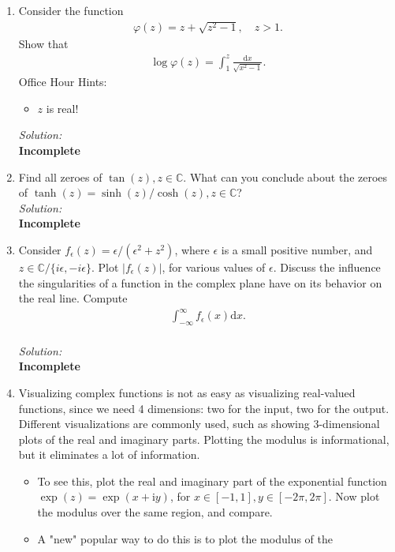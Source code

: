 \documentclass[10pt]{amsart}
\newcommand{\D}{\mathrm{d}}
\newcommand{\I}{\mathrm{i}}
\theoremstyle{nonumberplain}
\begin{document}
\begin{enumerate}[label={\bf {\arabic*}:}]
\item Consider the function
    \begin{align*}
      \varphi(z) = z + \sqrt{z^2 - 1}, \quad z > 1.
    \end{align*}
    Show that
    \begin{align*}
      \log \varphi(z) = \int_1^z \frac{\D x}{\sqrt{x^2 - 1}}.
    \end{align*}
Office Hour Hints:
\begin{itemize}
\item $z$ is real!
\end{itemize}
\textit{Solution:} \\
\textbf{Incomplete} \\
\item Find all zeroes of $\tan (z), z \in \mathbb{C}$. What can you
  conclude about the zeroes of $\tanh (z)=\sinh (z) / \cosh (z), z \in
  \mathbb C$?\\
\textit{Solution:} \\
\textbf{Incomplete} \\
\item Consider $f_\epsilon(z)=\epsilon /\left(\epsilon^2+z^2\right)$, where
  $\epsilon$ is a small positive number, and $z \in \mathbb{C} /\{i
  \epsilon,-i \epsilon\}$. Plot $\left|f_\epsilon(z)\right|$, for various
  values of $\epsilon$. Discuss the influence the singularities of a
  function in the complex plane have on its behavior on the real
  line. Compute
  \begin{align*}
    \int_{-\infty}^\infty f_\epsilon(x) \D x.
  \end{align*}\\
\textit{Solution:} \\
\textbf{Incomplete} \\
\item Visualizing complex functions is not as easy as visualizing
  real-valued functions, since we need 4 dimensions: two for the input,
  two for the output. Different visualizations are commonly used, such
  as showing 3-dimensional plots of the real and imaginary
  parts. Plotting the modulus is informational, but it eliminates a
  lot of information.
  \begin{itemize}
\item To see this, plot the real and imaginary part of the exponential function $\exp (z)=\exp (x+\I y)$, for $x \in[-1,1], y \in[-2 \pi, 2 \pi]$. Now plot the modulus over the same region, and compare.
\item A "new" popular way to do this is to plot the modulus of the

\end{itemize}
\end{enumerate}
\end{document}
